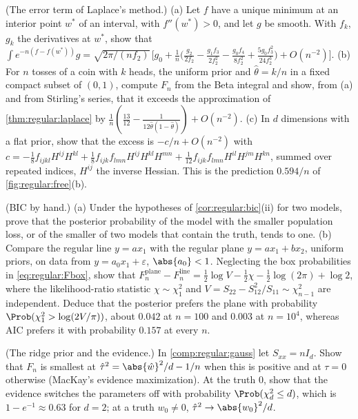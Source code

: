 \begin{refsection}
\begin{exercises}
\item \consolidation\hard (The error term of Laplace's method.) (a) Let $f$ have a unique minimum at an interior point $w^*$ of an interval, with $f''(w^*)>0$, and let $g$ be smooth. With $f_k$, $g_k$ the derivatives at $w^*$, show that $\int e^{-n(f-f(w^*))}g=\sqrt{2\pi/(nf_2)}\,\bigl[g_0+\frac1n\bigl(\frac{g_2}{2f_2}-\frac{g_1f_3}{2f_2^2}-\frac{g_0f_4}{8f_2^2}+\frac{5g_0f_3^2}{24f_2^3}\bigr)+O(n^{-2})\bigr]$. (b) For $n$ tosses of a coin with $k$ heads, the uniform prior and $\hat\theta=k/n$ in a fixed compact subset of $(0,1)$, compute $F_n$ from the Beta integral and show, from (a) and from Stirling's series, that it exceeds the approximation of \cref{thm:regular:laplace} by $\frac1n(\frac{13}{12}-\frac1{12\hat\theta(1-\hat\theta)})+O(n^{-2})$. (c) In $d$ dimensions with a flat prior, show that the excess is $-c/n+O(n^{-2})$ with $c=-\frac18f_{ijkl}H^{ij}H^{kl}+\frac18f_{ijk}f_{lmn}H^{ij}H^{kl}H^{mn}+\frac1{12}f_{ijk}f_{lmn}H^{il}H^{jm}H^{kn}$, summed over repeated indices, $H^{ij}$ the inverse Hessian. This is the prediction $0.594/n$ of \cref{fig:regular:free}(b). \label{ex:regular:error}

\item \byhand (BIC by hand.) (a) Under the hypotheses of \cref{cor:regular:bic}(ii) for two models, prove that the posterior probability of the model with the smaller population loss, or of the smaller of two models that contain the truth, tends to one. (b) Compare the regular line $y=ax_1$ with the regular plane $y=ax_1+bx_2$, uniform priors, on data from $y=a_0x_1+\varepsilon$, $\abs{a_0}<1$. Neglecting the box probabilities in \eqref{eq:regular:Fbox}, show that $F_n^{\mathrm{plane}}-F_n^{\mathrm{line}}=\frac12\log V-\frac12\chi-\frac12\log(2\pi)+\log2$, where the likelihood-ratio statistic $\chi\sim\chi^2_1$ and $V=S_{22}-S_{12}^2/S_{11}\sim\chi^2_{n-1}$ are independent. Deduce that the posterior prefers the plane with probability $\Prob(\chi^2_1>\log(2V/\pi))$, about $0.042$ at $n=100$ and $0.003$ at $n=10^4$, whereas AIC prefers it with probability $0.157$ at every $n$.\label{ex:regular:nested}

\item \byhand (The ridge prior and the evidence.) In \cref{comp:regular:gauss} let $S_{xx}=nI_d$. Show that $F_n$ is smallest at $\hat\tau^2=\abs{\hat w}^2/d-1/n$ when this is positive and at $\tau=0$ otherwise (MacKay's evidence maximization). At the truth $0$, show that the evidence switches the parameters off with probability $\Prob(\chi^2_d\le d)$, which is $1-e^{-1}\approx0.63$ for $d=2$; at a truth $w_0\ne0$, $\hat\tau^2\to\abs{w_0}^2/d$.\label{ex:regular:ridge}


\end{exercises}
\end{refsection}
